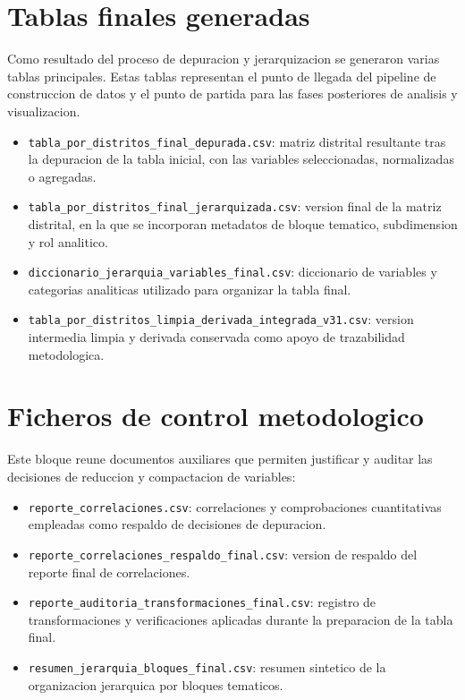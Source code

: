 \section{Tablas finales generadas}

Como resultado del proceso de depuracion y jerarquizacion se generaron varias tablas principales. Estas tablas representan el punto de llegada del pipeline de construccion de datos y el punto de partida para las fases posteriores de analisis y visualizacion.

\begin{itemize}
    \item \texttt{tabla\_por\_distritos\_final\_depurada.csv}: matriz distrital resultante tras la depuracion de la tabla inicial, con las variables seleccionadas, normalizadas o agregadas.
    \item \texttt{tabla\_por\_distritos\_final\_jerarquizada.csv}: version final de la matriz distrital, en la que se incorporan metadatos de bloque tematico, subdimension y rol analitico.
    \item \texttt{diccionario\_jerarquia\_variables\_final.csv}: diccionario de variables y categorias analiticas utilizado para organizar la tabla final.
    \item \texttt{tabla\_por\_distritos\_limpia\_derivada\_integrada\_v31.csv}: version intermedia limpia y derivada conservada como apoyo de trazabilidad metodologica.
\end{itemize}

\section{Ficheros de control metodologico}

Este bloque reune documentos auxiliares que permiten justificar y auditar las decisiones de reduccion y compactacion de variables:

\begin{itemize}
    \item \texttt{reporte\_correlaciones.csv}: correlaciones y comprobaciones cuantitativas empleadas como respaldo de decisiones de depuracion.
    \item \texttt{reporte\_correlaciones\_respaldo\_final.csv}: version de respaldo del reporte final de correlaciones.
    \item \texttt{reporte\_auditoria\_transformaciones\_final.csv}: registro de transformaciones y verificaciones aplicadas durante la preparacion de la tabla final.
    \item \texttt{resumen\_jerarquia\_bloques\_final.csv}: resumen sintetico de la organizacion jerarquica por bloques tematicos.
\end{itemize}

